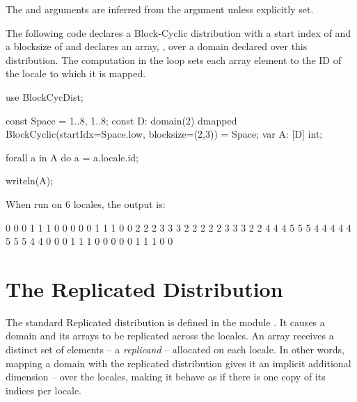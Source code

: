 
The  and  arguments are inferred from the
 argument unless explicitly set.

\begin{example}
The following code declares a Block-Cyclic distribution with a start index
of  and a blocksize of  and declares an array, , over a domain
declared over this distribution.  The computation in the 
loop sets each array element to the ID of the locale to which it is
mapped.
\begin{chapel}
use BlockCycDist;

const Space = {1..8, 1..8};
const D: domain(2) dmapped BlockCyclic(startIdx=Space.low, 
                                       blocksize=(2,3)) 
       = Space;
var A: [D] int;

forall a in A do
  a = a.locale.id;

writeln(A);
\end{chapel}
When run on 6 locales, the output is:
\begin{chapelprintoutput}{}
0 0 0 1 1 1 0 0
0 0 0 1 1 1 0 0
2 2 2 3 3 3 2 2
2 2 2 3 3 3 2 2
4 4 4 5 5 5 4 4
4 4 4 5 5 5 4 4
0 0 0 1 1 1 0 0
0 0 0 1 1 1 0 0
\end{chapelprintoutput}
\end{example}


\section{The Replicated Distribution}
\label{Replicated_Dist}

The standard Replicated distribution is defined in the module
.
It causes a domain and its arrays to be replicated across the locales.
An array receives a distinct set of elements -- a \emph{replicand} --
allocated on each locale.
%
In other words, mapping a domain with the replicated distribution gives it
an implicit additional dimension -- over the locales,
making it behave as if there is one copy of its indices per locale.

